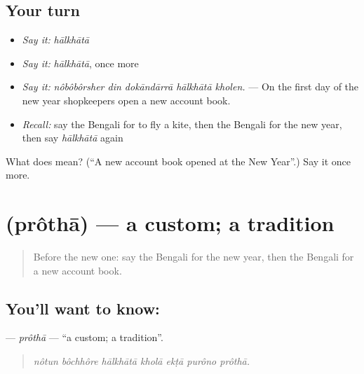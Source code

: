 \subsection*{Your turn}
\begin{itemize}
\raggedright
  \item \emph{Say it:} \emph{hālkhātā}
  \item \emph{Say it:} \emph{hālkhātā}, once more
  \item \emph{Say it:} \emph{nôbôbôrsher din dokāndārrā hālkhātā kholen.} — On the first day of the new year shopkeepers open a new account book.
  \item \emph{Recall:} say the Bengali for to fly a kite, then the Bengali for the new year, then say \emph{hālkhātā} again
\end{itemize}

\begin{tcolorbox}[breakable,colback=teal!4,colframe=teal!35!black,title={Before you move on}]
What does  mean? (\textquotedblleft{}A new account book opened at the New Year\textquotedblright{}.) Say it once more.
\end{tcolorbox}
\section[\texorpdfstring{\bn{প্রথা} (prôthā)}{প্রথা (prôthā)}]{ (prôthā) — a custom; a tradition}

\label{lesson:BN-C309-protha}



\begin{quote}
Before the new one: say the Bengali for the new year, then the Bengali for a new account book.
\end{quote}

\subsection*{You'll want to know: }
\textbf{} — \emph{prôthā} — \textquotedblleft{}a custom; a tradition\textquotedblright{}.

\begin{quote}
      
\end{quote}

\begin{quote}
\emph{nôtun bôchhôre hālkhātā kholā ekṭā purôno prôthā.}
\end{quote}


